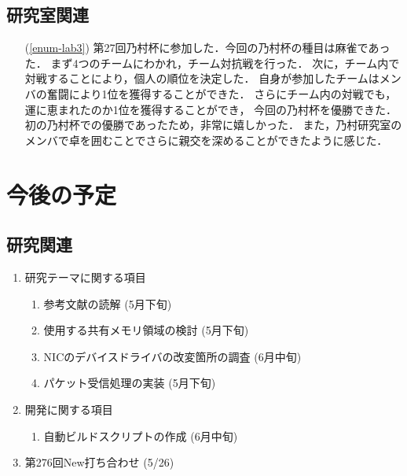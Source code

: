 \documentclass[fleqn, 14pt]{extarticle}
\begin{document}
\subsection{研究室関連}
\label{sec-3-2}
\begin{itemize}
\item[(\ref{enum-lab3})]
    第27回乃村杯に参加した．今回の乃村杯の種目は麻雀であった．
    まず4つのチームにわかれ，チーム対抗戦を行った．
    次に，チーム内で対戦することにより，個人の順位を決定した．
    自身が参加したチームはメンバの奮闘により1位を獲得することができた．
    さらにチーム内の対戦でも，運に恵まれたのか1位を獲得することができ，
    今回の乃村杯を優勝できた．
    初の乃村杯での優勝であったため，非常に嬉しかった．
    また，乃村研究室のメンバで卓を囲むことでさらに親交を深めることができたように感じた．

\end{itemize}

\section{今後の予定}
\label{sec-4}
\subsection{研究関連}
\label{sec-4-1}

\begin{enumerate}

\item 研究テーマに関する項目
\hfill
\begin{enumerate}


\item 参考文献の読解
\hfill
(5月下旬)

\item 使用する共有メモリ領域の検討
\hfill
(5月下旬)

\item NICのデバイスドライバの改変箇所の調査
\hfill
(6月中旬)

\item パケット受信処理の実装
\hfill
(5月下旬)
\end{enumerate}
\item 開発に関する項目
\hfill
\begin{enumerate}

\item 自動ビルドスクリプトの作成
\hfill
(6月中旬)

\end{enumerate}

\item 第276回New打ち合わせ
\hfill
\label{enum-7}
(5/26)

\end{enumerate}
\end{document}
